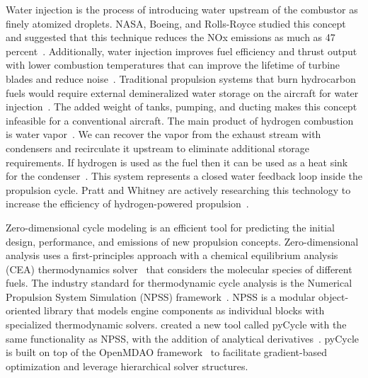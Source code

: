 \documentclass[conf]{new-aiaa}
\begin{document}
Water injection is the process of introducing water upstream of the combustor as finely atomized droplets.
NASA, Boeing, and Rolls-Royce studied this concept and suggested that this technique reduces the NOx emissions as much as 47 percent~\cite{Daggett2010}.
Additionally, water injection improves fuel efficiency and thrust output with lower combustion temperatures that can improve the lifetime of turbine blades and reduce noise~\cite{Daggett2010}.
Traditional propulsion systems that burn hydrocarbon fuels would require external demineralized water storage on the aircraft for water injection~\cite{Mourouzidis2015}.
The added weight of tanks, pumping, and ducting makes this concept infeasible for a conventional aircraft.
The main product of hydrogen combustion is water vapor~\cite{Strom2002}.
We can recover the vapor from the exhaust stream with condensers and recirculate it upstream to eliminate additional storage requirements.
If hydrogen is used as the fuel then it can be used as a heat sink for the condenser~\cite{Boggia2002}.
This system represents a closed water feedback loop inside the propulsion cycle.
Pratt and Whitney are actively researching this technology to increase the efficiency of hydrogen-powered propulsion~\cite{arpa-e_2021}.

Zero-dimensional cycle modeling is an efficient tool for predicting the initial design, performance, and emissions of new propulsion concepts.
Zero-dimensional analysis uses a first-principles approach with a chemical equilibrium analysis (CEA) thermodynamics solver~\cite{Gordon1994} that considers the molecular species of different fuels.
The industry standard for thermodynamic cycle analysis is the Numerical Propulsion System Simulation (NPSS) framework~\cite{JonesNPSS}.
NPSS is a modular object-oriented library that models engine components as individual blocks with specialized thermodynamic solvers.
\citet{Hendricks2019} created a new tool called pyCycle with the same functionality as NPSS, with the addition of analytical derivatives~\cite{Gray2017b}.
pyCycle is built on top of the OpenMDAO framework~\cite{Gray2019a} to facilitate gradient-based optimization and leverage hierarchical solver structures.
\end{document}
